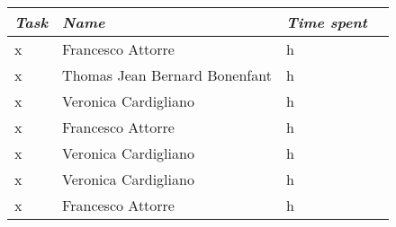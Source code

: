 \begin{table}[H]
\begin{tabular}{|l|l|l|l|}
\hline
\textit{\textbf{Task}} & \textit{\textbf{Name}}        & \textit{\textbf{Time spent}}                                                                                                                                                                                                                                                                   \\ \hline
x & Francesco Attorre             & h
\\ \hline
x & Thomas Jean Bernard Bonenfant & h  
\\ \hline                                                                                                                                                                                                                                                                                     
x & Veronica Cardigliano          & h                                                                                                                                                                                                                                                                                \\ \hline
x              & Francesco Attorre             & h                                                                                                                                                                                                                                                                                 \\ \hline
x             & Veronica Cardigliano          & h                                                                                                                                                                                                                                                                                    \\ \hline
x               & Veronica Cardigliano          & h                                                                                                                                                                                                                                                                           \\ \hline
x                & Francesco Attorre             & h                                                                                                                                                                                                                                                                                \\ \hline

\end{tabular}
\end{table}
